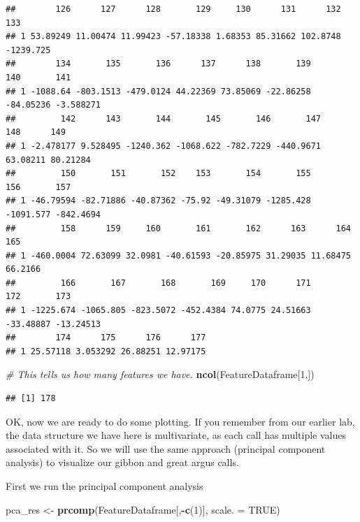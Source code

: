 \documentclass[]{book}
\newenvironment{Shaded}{\begin{snugshade}}{\end{snugshade}}
\newcommand{\CommentTok}[1]{\textcolor[rgb]{0.56,0.35,0.01}{\textit{#1}}}
\newcommand{\DataTypeTok}[1]{\textcolor[rgb]{0.13,0.29,0.53}{#1}}
\newcommand{\DecValTok}[1]{\textcolor[rgb]{0.00,0.00,0.81}{#1}}
\newcommand{\KeywordTok}[1]{\textcolor[rgb]{0.13,0.29,0.53}{\textbf{#1}}}
\newcommand{\NormalTok}[1]{#1}
\newcommand{\OperatorTok}[1]{\textcolor[rgb]{0.81,0.36,0.00}{\textbf{#1}}}
\newcommand{\OtherTok}[1]{\textcolor[rgb]{0.56,0.35,0.01}{#1}}
\newcommand{\StringTok}[1]{\textcolor[rgb]{0.31,0.60,0.02}{#1}}
\begin{document}
\begin{verbatim}
##        126      127      128       129     130      131      132       133
## 1 53.89249 11.00474 11.99423 -57.18338 1.68353 85.31662 102.8748 -1239.725
##        134       135       136      137      138       139       140       141
## 1 -1088.64 -803.1513 -479.0124 44.22369 73.85069 -22.86258 -84.05236 -3.588271
##         142      143       144       145       146       147      148      149
## 1 -2.478177 9.528495 -1240.362 -1068.622 -782.7229 -440.9671 63.08211 80.21284
##         150       151       152    153       154       155       156       157
## 1 -46.79594 -82.71886 -40.87362 -75.92 -49.31079 -1285.428 -1091.577 -842.4694
##         158      159     160       161       162      163      164     165
## 1 -460.0004 72.63099 32.0981 -40.61593 -20.85975 31.29035 11.68475 66.2166
##         166       167       168       169     170      171       172       173
## 1 -1225.674 -1065.805 -823.5072 -452.4384 74.0775 24.51663 -33.48887 -13.24513
##        174      175      176      177
## 1 25.57118 3.053292 26.88251 12.97175
\end{verbatim}

\begin{Shaded}
\begin{Highlighting}[]
\CommentTok{# This tells us how many features we have.}
\KeywordTok{ncol}\NormalTok{(FeatureDataframe[}\DecValTok{1}\NormalTok{,]) }
\end{Highlighting}
\end{Shaded}

\begin{verbatim}
## [1] 178
\end{verbatim}

OK, now we are ready to do some plotting. If you remember from our earlier lab, the data structure we have here is multivariate, as each call has multiple values associated with it. So we will use the same approach (principal component analysis) to visualize our gibbon and great argus calls.

First we run the principal component analysis

\begin{Shaded}
\begin{Highlighting}[]
\NormalTok{pca_res <-}\StringTok{ }\KeywordTok{prcomp}\NormalTok{(FeatureDataframe[,}\OperatorTok{-}\KeywordTok{c}\NormalTok{(}\DecValTok{1}\NormalTok{)], }\DataTypeTok{scale. =} \OtherTok{TRUE}\NormalTok{)}
\end{Highlighting}
\end{Shaded}
\end{document}
